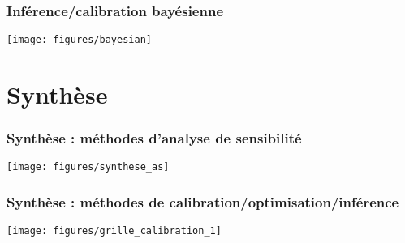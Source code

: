 \documentclass[10pt]{beamer}
\begin{document}
\begin{frame}
\frametitle{Inférence/calibration bayésienne}

\begin{center}
	\texttt{[image: figures/bayesian]}
\end{center}

\end{frame}

\section{Synthèse}

\begin{frame}
\frametitle{Synthèse : méthodes d'analyse de sensibilité}

\begin{center}
	\texttt{[image: figures/synthese\_as]}
\end{center}

\end{frame}

\begin{frame}
\frametitle{Synthèse : méthodes de calibration/optimisation/inférence}

\begin{center}
	\texttt{[image: figures/grille\_calibration\_1]}
\end{center}

\end{frame}
\end{document}
